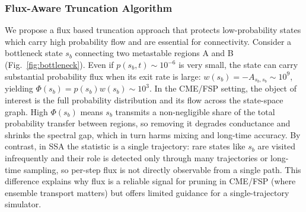 \documentclass[review,onefignum,onetabnum]{siamart171218}
\begin{document}
\subsubsection{Flux-Aware Truncation Algorithm}

We propose a flux based truncation approach that protects low-probability states which carry high probability flow and are essential for connectivity. Consider a bottleneck state $s_b$ connecting two metastable regions A and B (Fig.~\ref{fig:bottleneck}). Even if $p(s_b, t) \sim 10^{-6}$ is very small, the state can carry substantial probability flux when its exit rate is large: $w(s_b) = -A_{s_b,s_b} \sim 10^9$, yielding $\Phi(s_b) = p(s_b) w(s_b) \sim 10^3$. In the CME/FSP setting, the object of interest is the full probability distribution and its flow across the state-space graph. High $\Phi(s_b)$ means $s_b$ transmits a non-negligible share of the total probability transfer between regions, so removing it degrades conductance and shrinks the spectral gap, which in turn harms mixing and long-time accuracy. By contrast, in SSA the statistic is a single trajectory: rare states like $s_b$ are visited infrequently and their role is detected only through many trajectories or long-time sampling, so per-step flux is not directly observable from a single path. This difference explains why flux is a reliable signal for pruning in CME/FSP (where ensemble transport matters) but offers limited guidance for a single-trajectory simulator.
\end{document}
